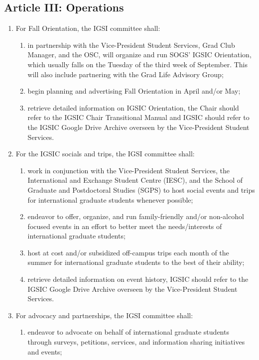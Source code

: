 \subsection{Article III: Operations}
\begin{enumerate}[label*=\arabic*., align=left]
\item For Fall Orientation, the IGSI committee shall:
\begin{enumerate}[label*=\arabic*., align=left]
\item in partnership with the Vice-President Student Services, Grad Club Manager, and the OSC, will organize and run SOGS’ IGSIC Orientation, which usually falls on the Tuesday of the third week of September. This will also include partnering with the Grad Life Advisory Group;
\item begin planning and advertising Fall Orientation in April and/or May;
\item retrieve detailed information on IGSIC Orientation, the Chair should refer to the IGSIC Chair Transitional Manual and IGSIC should refer to the IGSIC Google Drive Archive overseen by the Vice-President Student Services.
\end{enumerate}
\item For the IGSIC socials and trips, the IGSI committee shall:
\begin{enumerate}[label*=\arabic*., align=left]
\item work in conjunction with the Vice-President Student Services, the International and Exchange Student Centre (IESC), and the School of Graduate and Postdoctoral Studies (SGPS) to host social events and trips for international graduate students whenever possible;
\item endeavor to offer, organize, and run family-friendly and/or non-alcohol focused events in an effort to better meet the needs/interests of international    graduate students;
\item host at cost and/or subsidized off-campus trips each month of the summer for international graduate students to the best of their ability;
\item retrieve detailed information on event history, IGSIC should refer to the IGSIC Google Drive Archive overseen by the Vice-President Student Services.
\end{enumerate}
\item For advocacy and partnerships, the IGSI committee shall:
\begin{enumerate}[label*=\arabic*., align=left]
\item endeavor to advocate on behalf of international graduate students through surveys, petitions, services, and information sharing initiatives and events;

\end{enumerate}
\end{enumerate}
